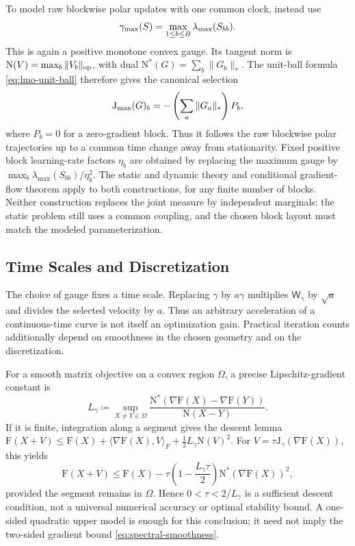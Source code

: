 \documentclass{article}
\newcommand{\mF}{\mathrm{F}}
\newcommand{\mN}{\mathrm{N}}
\newcommand{\mJ}{\mathrm{J}}
\newcommand{\Wg}{\mathsf{W}_{\gamma}}
\begin{document}
To model raw blockwise polar updates with one common clock, instead use
\[
 \gamma_{\rm max}(S)=\max_{1\le b\le B}\lambda_{\max}(S_{bb}).
\]
This is again a positive monotone convex gauge. Its tangent norm is
$\mN(V)=\max_b\|V_b\|_{\rm op}$, with dual
$\mN^*(G)=\sum_b\|G_b\|_*$. The unit-ball formula
\eqref{eq:lmo-unit-ball} therefore gives the canonical selection
\[
 \mJ_{\rm max}(G)_b=-\left(\sum_a\|G_a\|_*\right)P_b,
\]
where $P_b=0$ for a zero-gradient block. Thus it follows the raw blockwise
polar trajectories up to a common time change away from stationarity.
Fixed positive block learning-rate factors $\eta_b$ are obtained by replacing
the maximum gauge by $\max_b\lambda_{\max}(S_{bb})/\eta_b^2$.
The static and dynamic theory and conditional gradient-flow theorem apply
to both constructions, for any finite number of blocks. Neither construction
replaces the joint measure by independent marginals: the static problem still
uses a common coupling, and the chosen block layout must match the modeled
parameterization.

\subsection{Time Scales and Discretization}
\label{sec:smoothness-discretization}
The choice of gauge fixes a time scale. Replacing $\gamma$ by $a\gamma$
multiplies $\Wg$ by $\sqrt a$ and divides the selected velocity by $a$.
Thus an arbitrary acceleration of a continuous-time curve is not itself an
optimization gain. Practical iteration counts additionally depend on
smoothness in the chosen geometry and on the discretization.

For a smooth matrix objective on a convex region $\Omega$, a precise
Lipschitz-gradient constant is
\begin{equation}\label{eq:spectral-smoothness}
 L_\gamma\coloneqq
 \sup_{X\ne Y\in\Omega}
 \frac{\mN^*(\nabla\mF(X)-\nabla\mF(Y))}{\mN(X-Y)}.
\end{equation}
If it is finite, integration along a segment gives the descent lemma
$\mF(X+V)\le\mF(X)+\langle\nabla\mF(X),V\rangle_F
+\frac12L_\gamma\mN(V)^2$.
For $V=\tau\mJ_\gamma(\nabla\mF(X))$, this yields
\[
 \mF(X+V)\le\mF(X)
 -\tau\left(1-\frac{L_\gamma\tau}{2}\right)
       \mN^*(\nabla\mF(X))^2,
\]
provided the segment remains in $\Omega$. Hence $0<\tau<2/L_\gamma$
is a sufficient descent condition, not a universal numerical accuracy or
optimal stability bound. A one-sided quadratic upper model is enough for
this conclusion; it need not imply the two-sided gradient bound
\eqref{eq:spectral-smoothness}.
\end{document}
